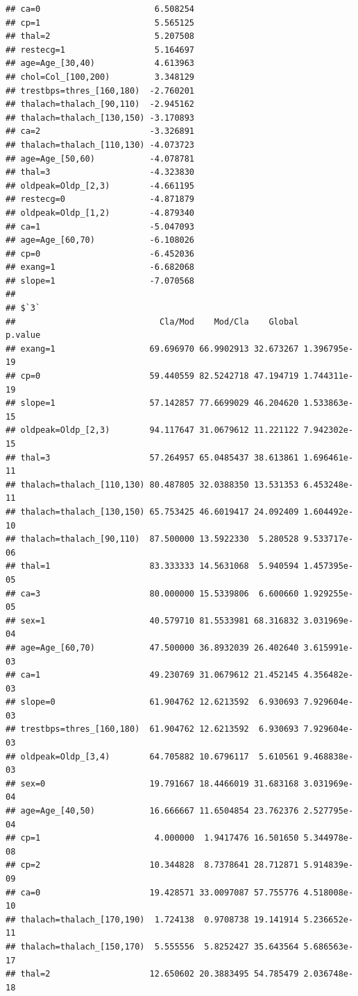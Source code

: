 \documentclass[]{article}
\begin{document}
\begin{verbatim}
## ca=0                       6.508254
## cp=1                       5.565125
## thal=2                     5.207508
## restecg=1                  5.164697
## age=Age_[30,40)            4.613963
## chol=Col_[100,200)         3.348129
## trestbps=thres_[160,180)  -2.760201
## thalach=thalach_[90,110)  -2.945162
## thalach=thalach_[130,150) -3.170893
## ca=2                      -3.326891
## thalach=thalach_[110,130) -4.073723
## age=Age_[50,60)           -4.078781
## thal=3                    -4.323830
## oldpeak=Oldp_[2,3)        -4.661195
## restecg=0                 -4.871879
## oldpeak=Oldp_[1,2)        -4.879340
## ca=1                      -5.047093
## age=Age_[60,70)           -6.108026
## cp=0                      -6.452036
## exang=1                   -6.682068
## slope=1                   -7.070568
## 
## $`3`
##                             Cla/Mod    Mod/Cla    Global      p.value
## exang=1                   69.696970 66.9902913 32.673267 1.396795e-19
## cp=0                      59.440559 82.5242718 47.194719 1.744311e-19
## slope=1                   57.142857 77.6699029 46.204620 1.533863e-15
## oldpeak=Oldp_[2,3)        94.117647 31.0679612 11.221122 7.942302e-15
## thal=3                    57.264957 65.0485437 38.613861 1.696461e-11
## thalach=thalach_[110,130) 80.487805 32.0388350 13.531353 6.453248e-11
## thalach=thalach_[130,150) 65.753425 46.6019417 24.092409 1.604492e-10
## thalach=thalach_[90,110)  87.500000 13.5922330  5.280528 9.533717e-06
## thal=1                    83.333333 14.5631068  5.940594 1.457395e-05
## ca=3                      80.000000 15.5339806  6.600660 1.929255e-05
## sex=1                     40.579710 81.5533981 68.316832 3.031969e-04
## age=Age_[60,70)           47.500000 36.8932039 26.402640 3.615991e-03
## ca=1                      49.230769 31.0679612 21.452145 4.356482e-03
## slope=0                   61.904762 12.6213592  6.930693 7.929604e-03
## trestbps=thres_[160,180)  61.904762 12.6213592  6.930693 7.929604e-03
## oldpeak=Oldp_[3,4)        64.705882 10.6796117  5.610561 9.468838e-03
## sex=0                     19.791667 18.4466019 31.683168 3.031969e-04
## age=Age_[40,50)           16.666667 11.6504854 23.762376 2.527795e-04
## cp=1                       4.000000  1.9417476 16.501650 5.344978e-08
## cp=2                      10.344828  8.7378641 28.712871 5.914839e-09
## ca=0                      19.428571 33.0097087 57.755776 4.518008e-10
## thalach=thalach_[170,190)  1.724138  0.9708738 19.141914 5.236652e-11
## thalach=thalach_[150,170)  5.555556  5.8252427 35.643564 5.686563e-17
## thal=2                    12.650602 20.3883495 54.785479 2.036748e-18

\end{verbatim}
\end{document}
